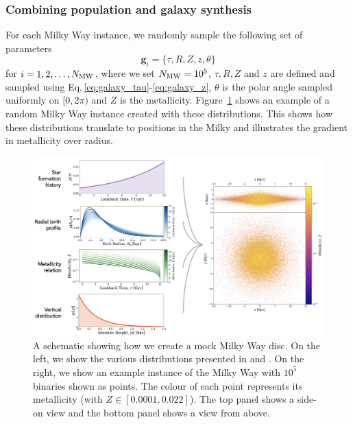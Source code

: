\documentclass[twocolumn]{aastex63}
\begin{document}
\subsubsection{Combining population and galaxy synthesis}

For each Milky Way instance, we randomly sample the following set of parameters
\begin{equation}
    \mathbf{g}_{{i}} = \{\tau, R, Z, z, \theta\}
\end{equation}
for $i = 1, 2, \dots, N_{\rm MW}$, where we set $N_{\rm MW} = 10^{5}$, $\tau, R, Z$ and $z$ are defined and sampled using Eq.\,\ref{eq:galaxy_tau}-\ref{eq:galaxy_z}, $\theta$ is the polar angle sampled uniformly on $[0, 2\pi)$ and $Z$ is the metallicity. Figure~\ref{fig:galaxy_schematic} shows an example of a random Milky Way instance created with these distributions. This shows how these distributions translate to positions in the Milky and illustrates the gradient in metallicity over radius.

\begin{figure}[t]
    \centering
    \includegraphics[width=\textwidth]{galaxy_diagram.png}
    \caption{A schematic showing how we create a mock Milky Way disc. On the left, we show the various distributions presented in \citet{Frankel+2018} and \citet{McMillan+2011}. On the right, we show an example instance of the Milky Way with $10^5$ binaries shown as points. The colour of each point represents its metallicity (with $Z \in [0.0001, 0.022]$). The top panel shows a side-on view and the bottom panel shows a view from above.}
    \label{fig:galaxy_schematic}
\end{figure}

\end{document}
